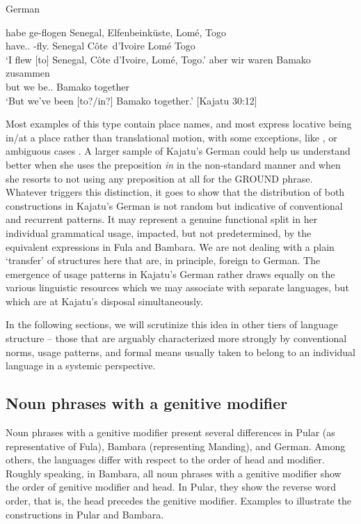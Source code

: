 \documentclass[output=paper]{langscibook}
\begin{document}
\begin{exe}
    \ex\label{fanego:ex:12} German 
    \begin{xlist}
        \ex\label{fanego:ex:12a} 
        \gll habe ge-flogen Senegal, Elfenbeinküste, Lomé, Togo\\
        have.\First\SG.\PRS{} \PTCP-fly.\PTCP{} Senegal Côte~d’Ivoire Lomé Togo \\
        \glt ‘I flew [to] Senegal, Côte d’Ivoire, Lomé, Togo.’
        \ex\label{fanego:ex:12b} 
        \gll aber wir waren Bamako zusammen \\
        but we be.\First\PL.\PST{} Bamako together \\
        \glt ‘But we’ve been [to?/in?] Bamako together.’ [Kajatu 30:12]
    \end{xlist}
\end{exe}

\noindent
Most examples of this type contain place names, and most express locative being in/at a place rather than translational motion, with some exceptions, like , or ambiguous cases . A larger sample of Kajatu’s German could help us understand better when she uses the preposition \textit{in} in the non-standard manner and when she resorts to not using any preposition at all for the GROUND phrase. Whatever triggers this distinction, it goes to show that the distribution of both constructions in Kajatu’s German is not random but indicative of conventional and recurrent patterns. It may represent a genuine functional split in her individual grammatical usage, impacted, but not predetermined, by the equivalent expressions in Fula and Bambara. We are not dealing with a plain ‘transfer’ of structures here that are, in principle, foreign to German. The emergence of usage patterns in Kajatu’s German rather draws equally on the various linguistic resources which we may associate with separate languages, but which are at Kajatu’s disposal simultaneously. 

In the following sections, we will scrutinize this idea in other tiers of language structure – those that are arguably characterized more strongly by conventional norms, usage patterns, and formal means usually taken to belong to an individual language in a systemic perspective.

\subsection{Noun phrases with a genitive modifier} \label{fanego:sec:5.2}
Noun phrases with a genitive modifier present several differences in Pular (as representative of Fula), Bambara (representing Manding), and German. Among others, the languages differ with respect to the order of head and modifier. Roughly speaking, in Bambara, all noun phrases with a genitive modifier show the order of genitive modifier and head. In Pular, they show the reverse word order, that is, the head precedes the genitive modifier. Examples  to  illustrate the constructions in Pular and Bambara.
\end{document}
